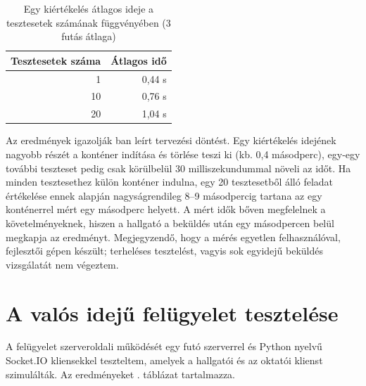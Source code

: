 \begin{table}[H]
  \centering
  \caption{Egy kiértékelés átlagos ideje a tesztesetek számának függvényében (3 futás átlaga)}
  \label{tab:teljesitmeny}
  \begin{tabular}{@{}rr@{}}
    \toprule
    Tesztesetek száma & Átlagos idő \\
    \midrule
    1  & 0,44 s \\
    10 & 0,76 s \\
    20 & 1,04 s \\
    \bottomrule
  \end{tabular}
\end{table}

Az eredmények igazolják ban leírt tervezési döntést. Egy kiértékelés idejének
nagyobb részét a konténer indítása és törlése teszi ki (kb. 0,4 másodperc), egy-egy további
teszteset pedig csak körülbelül 30 milliszekundummal növeli az időt. Ha minden tesztesethez
külön konténer indulna, egy 20 tesztesetből álló feladat értékelése ennek alapján
nagyságrendileg 8--9 másodpercig tartana az egy konténerrel mért egy másodperc helyett. A mért
idők bőven megfelelnek a követelményeknek, hiszen a hallgató a beküldés után egy másodpercen belül
megkapja az eredményt. Megjegyzendő, hogy a mérés egyetlen felhasználóval, fejlesztői gépen
készült; terheléses tesztelést, vagyis sok egyidejű beküldés vizsgálatát nem végeztem.

\section{A valós idejű felügyelet tesztelése}
\label{sec:felugyelet_teszt}

A felügyelet szerveroldali működését egy futó szerverrel és Python nyelvű Socket.IO kliensekkel
teszteltem, amelyek a hallgatói és az oktatói klienst szimulálták. Az eredményeket
. táblázat tartalmazza.

